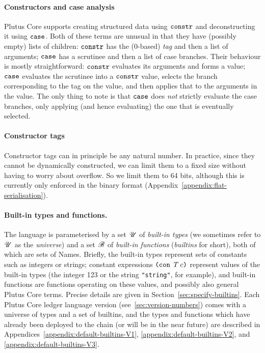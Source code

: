 \paragraph{Constructors and case analysis}
Plutus Core supports creating structured data using $\texttt{constr}$ and deconstructing
it using $\texttt{case}$. Both of these terms are unusual in that they have (possibly
empty) lists of children: $\texttt{constr}$ has the (0-based) \emph{tag} and then a list of arguments;
$\texttt{case}$ has a scrutinee and then a list of case branches. Their behaviour is mostly
straightforward: $\texttt{constr}$ evaluates its arguments and forms a value; $\texttt{case}$
evaluates the scrutinee into a $\texttt{constr}$ value, selects the branch corresponding to
the tag on the value, and then applies that to the arguments in the value. The only thing
to note is that $\texttt{case}$ does \emph{not} strictly evaluate the case branches, only
applying (and hence evaluating) the one that is eventually selected.

\paragraph{Constructor tags}
Constructor tags can in principle be any natural number. In practice, since they cannot
be dynamically constructed, we can limit them to a fixed size without having to worry
about overflow. So we limit them to 64 bits, although this is currently only enforced in
the binary format (Appendix~\ref{appendix:flat-serialisation}).

\paragraph{Built-in types and functions.} The language is parameterised by a set $\mathscr{U}$ of
\textit{built-in types} (we sometimes refer to $\mathscr{U}$ as the \textit{universe})
and a set $\mathscr{B}$ of \textit{built-in functions} (\textit{builtins} for short),
both of which are sets of Names.  Briefly, the built-in types represent sets of
constants such as integers or strings; constant expressions $\texttt{(} \texttt{con} ~ \textit{T} ~ c \texttt{)}$
represent values of the built-in types (the integer 123 or the string
\texttt{"string"}, for example), and built-in functions are functions operating
on these values, and possibly also general Plutus Core terms.  Precise details
are given in Section~\ref{sec:specify-builtins}.  Each Plutus Core ledger
language version (see~\ref{sec:version-numbers}) comes with a universe of types
and a set of builtins, and the types and functions which have already been
deployed to the chain (or will be in the near future) are described in
Appendices~\ref{appendix:default-builtins-V1},
\ref{appendix:default-builtins-V2}, and \ref{appendix:default-builtins-V3}.%

